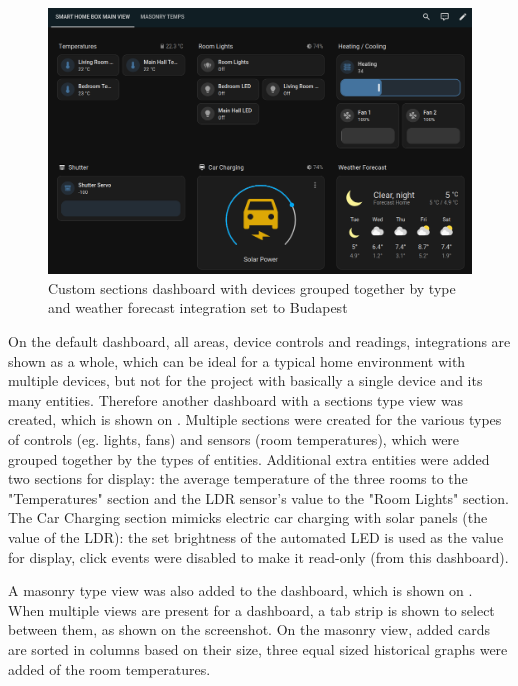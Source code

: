\begin{figure}[!ht]
  \centering
  \includegraphics[width=150mm, keepaspectratio]{figures/homeassistant_dashboard_custom.png}
  \caption{Custom sections dashboard with devices grouped together by type and weather forecast integration set to Budapest}
  \label{fig:HAcustomDashboard}
\end{figure}

On the default dashboard, all areas, device controls and readings, integrations are shown as a whole, which can be ideal for a typical home environment with multiple devices, but not for the project with basically a single device and its many entities. Therefore another dashboard with a sections type view was created, which is shown on . Multiple sections were created for the various types of controls (eg. lights, fans) and sensors (room temperatures), which were grouped together by the types of entities. Additional extra entities were added two sections for display: the average temperature of the three rooms to the "Temperatures" section and the LDR sensor's value to the "Room Lights" section. The Car Charging section mimicks electric car charging with solar panels (the value of the LDR): the set brightness of the automated LED is used as the value for display, click events were disabled to make it read-only (from this dashboard).

A masonry type view was also added to the dashboard, which is shown on . When multiple views are present for a dashboard, a tab strip is shown to select between them, as shown on the screenshot. On the masonry view, added cards are sorted in columns based on their size, three equal sized historical graphs were added of the room temperatures.

